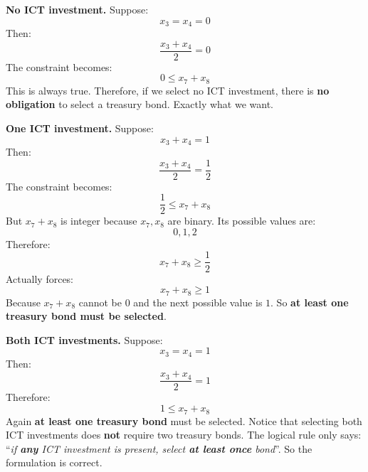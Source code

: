 \begin{examplebox}
    \highspace
    \textcolor{Green3}{ \textbf{No ICT investment.}} Suppose:
    \begin{equation*}
        x_3=x_4=0
    \end{equation*}
    Then:
    \begin{equation*}
        \frac{x_3+x_4}{2}=0
    \end{equation*}
    The constraint becomes:
    \begin{equation*}
        0\leq x_7+x_8
    \end{equation*}
    This is always true. Therefore, if we select no ICT investment, there is \textbf{no obligation} to select a treasury bond. Exactly what we want.

    \highspace
    \textcolor{Green3}{ \textbf{One ICT investment.}} Suppose:
    \begin{equation*}
        x_3+x_4=1
    \end{equation*}
    Then:
    \begin{equation*}
        \frac{x_3+x_4}{2}=\frac{1}{2}
    \end{equation*}
    The constraint becomes:
    \begin{equation*}
        \frac{1}{2} \leq x_7+x_8
    \end{equation*}
    But $x_7+x_8$ is integer because $x_7,x_8$ are binary. Its possible values are:
    \begin{equation*}
        0,1,2
    \end{equation*}
    Therefore:
    \begin{equation*}
        x_7+x_8 \geq \frac{1}{2}
    \end{equation*}
    Actually forces:
    \begin{equation*}
        x_7+x_8\geq1
    \end{equation*}
    Because $x_7+x_8$ cannot be $0$ and the next possible value is $1$. So \textbf{at least one treasury bond must be selected}.

    \highspace
    \textcolor{Green3}{ \textbf{Both ICT investments.}} Suppose:
    \begin{equation*}
        x_3=x_4=1
    \end{equation*}
    Then:
    \begin{equation*}
        \frac{x_3+x_4}{2}=1
    \end{equation*}
    Therefore:
    \begin{equation*}
        1\leq x_7+x_8
    \end{equation*}
    Again \textbf{at least one treasury bond} must be selected. Notice that selecting both ICT investments does \textbf{not} require two treasury bonds. The logical rule only says: ``\emph{if \textbf{any} ICT investment is present, select \textbf{at least once} bond}''. So the formulation is correct.


\end{examplebox}
